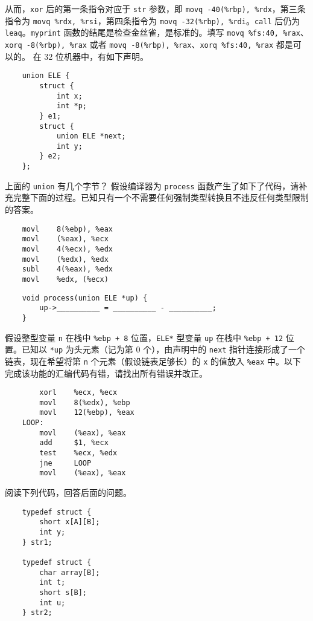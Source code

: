 \begin{problems}
        从而，\verb|xor| 后的第一条指令对应于 \verb|str| 参数，即 \verb|movq -40(%rbp), %rdx|，第三条指令为 \verb|movq %rdx, %rsi|，第四条指令为 \verb|movq -32(%rbp), %rdi|。\verb|call| 后仍为 \verb|leaq|。\verb|myprint| 函数的结尾是检查金丝雀，是标准的。填写 \verb|movq %fs:40, %rax|、\verb|xorq -8(%rbp), %rax| 或者 \verb|movq -8(%rbp), %rax|、\verb|xorq %fs:40, %rax| 都是可以的。
         在 32 位机器中，有如下声明。
        \begin{verbatim}
    union ELE {
        struct {
            int x;
            int *p;
        } e1;
        struct {
            union ELE *next;
            int y;
        } e2;
    };
        \end{verbatim}
        \qn 上面的 \verb|union| 有几个字节？
        \qn 假设编译器为 \verb|process| 函数产生了如下了代码，请补充完整下面的过程。已知只有一个不需要任何强制类型转换且不违反任何类型限制的答案。
        \begin{verbatim}
    movl    8(%ebp), %eax
    movl    (%eax), %ecx
    movl    4(%ecx), %edx
    movl    (%edx), %edx
    subl    4(%eax), %edx
    movl    %edx, (%ecx)
        \end{verbatim}
        \begin{verbatim}
    void process(union ELE *up) {
        up->__________ = __________ - __________;
    }
        \end{verbatim}
        \qn 假设整型变量 \verb|n| 在栈中 \verb|%ebp + 8| 位置，\verb|ELE*| 型变量 \verb|up| 在栈中 \verb|%ebp + 12| 位置。已知以 \verb|*up| 为头元素（记为第 0 个），由声明中的 \verb|next| 指针连接形成了一个链表，现在希望将第 \verb|n| 个元素（假设链表足够长）的 \verb|x| 的值放入 \verb|%eax| 中。以下完成该功能的汇编代码有错，请找出所有错误并改正。
        \begin{verbatim}
        xorl    %ecx, %ecx
        movl    8(%edx), %ebp
        movl    12(%ebp), %eax
    LOOP:
        movl    (%eax), %eax
        add     $1, %ecx
        test    %ecx, %edx
        jne     LOOP
        movl    (%eax), %eax
        \end{verbatim}
        \qn 阅读下列代码，回答后面的问题。
        \begin{verbatim}
    typedef struct {
        short x[A][B];
        int y;
    } str1;

    typedef struct {
        char array[B];
        int t;
        short s[B];
        int u;
    } str2;


\end{verbatim}
\end{problems}
